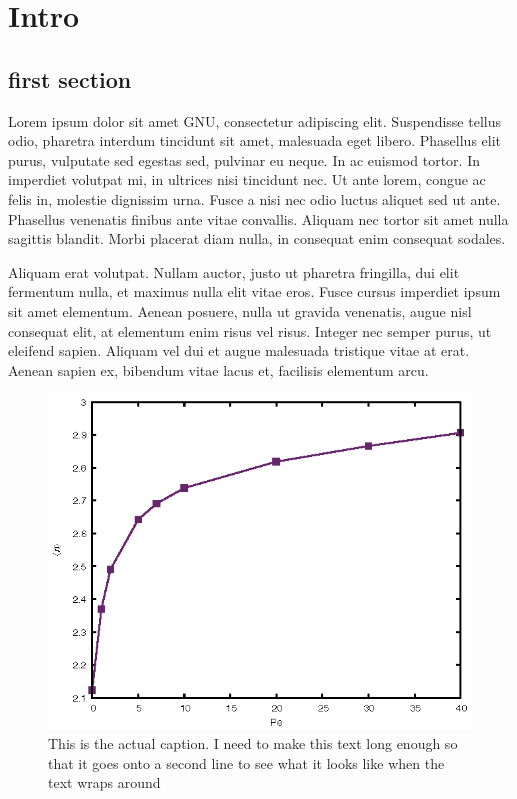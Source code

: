 \chapter{Intro}
\label{chapter:intro}

\section{first section}
Lorem ipsum dolor sit amet \gls{GNU}, consectetur adipiscing elit. Suspendisse tellus odio, pharetra interdum tincidunt sit amet, malesuada eget libero. Phasellus elit purus, vulputate sed egestas sed, pulvinar eu neque. In ac euismod tortor. In imperdiet volutpat mi, in ultrices nisi tincidunt nec. Ut ante lorem, congue ac felis in, molestie dignissim urna. Fusce a nisi nec odio luctus aliquet sed ut ante. Phasellus venenatis finibus ante vitae convallis. Aliquam nec tortor sit amet nulla sagittis blandit. Morbi placerat diam nulla, in consequat enim consequat sodales. \cite{james}

Aliquam erat volutpat. Nullam auctor, justo ut pharetra fringilla, dui elit fermentum nulla, et maximus nulla elit vitae eros. Fusce cursus imperdiet ipsum sit amet elementum. Aenean posuere, nulla ut gravida venenatis, augue nisl consequat elit, at elementum enim risus vel risus. Integer nec semper purus, ut eleifend sapien. Aliquam vel dui et augue malesuada tristique vitae at erat. Aenean sapien ex, bibendum vitae lacus et, facilisis elementum arcu.


\begin{figure}[h]
	\includegraphics[width=0.8\linewidth]{figs/test.eps}
	\caption[Caption for the list of figures]{This is the actual caption. I need to make this text long enough so that it goes onto a second line to see what it looks like when the text wraps around}
	\label{fig:intro:test}
\end{figure}

